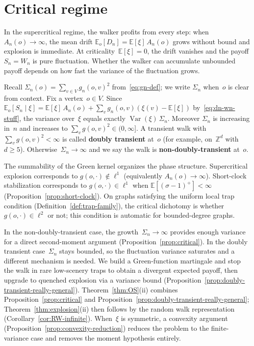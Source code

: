 \documentclass[11pt]{amsart}
\theoremstyle{plain}
\theoremstyle{definition}
\newcommand{\Z}{\mathbb{Z}}
\newcommand{\E}{\mathbb{E}}
\DeclareMathOperator{\var}{Var}
\begin{document}
	
	\section{Critical regime}\label{sec:critical}
	
	In the supercritical regime, the walker profits from every step: when $A_n(o)\to\infty$, the mean drift $\E_o[D_n]=\E[\xi]\,A_n(o)$ grows without bound and explosion is immediate. At criticality~$\E[\xi]=0$, the drift vanishes and the payoff $S_n = W_n$ is pure fluctuation. Whether the walker can accumulate unbounded payoff depends on how fast the variance of the fluctuation grows.
	
	Recall $\Sigma_n(o)=\sum_{v\in V} g_n(o,v)^2$ from~\eqref{eq:gn-def}; we write $\Sigma_n$ when~$o$ is clear from context. Fix a vertex~$o\in V$.
	Since~$\E_o[S_n\mid\xi]=\E[\xi]\,A_n(o)+\sum_v g_n(o,v)(\xi(v)-\E[\xi])$ by~\eqref{eq:dn-wn-stuff}, the variance over~$\xi$ equals exactly $\var(\xi)\,\Sigma_n$. Moreover $\Sigma_n$ is increasing in~$n$ and increases to $\sum_v g(o,v)^2\in(0,\infty]$.
	A transient walk with~$\sum_v g(o,v)^2<\infty$ is called \textbf{doubly transient} at~$o$ (for example, on~$\Z^d$ with $d\geq 5$). Otherwise~$\Sigma_n\to\infty$ and we say the walk is \textbf{non-doubly-transient} at~$o$.
	
	The summability of the Green kernel organizes the phase structure. Supercritical explosion corresponds to $g(o,\cdot)\notin\ell^1$ (equivalently $A_n(o)\to\infty$). Short-clock stabilization corresponds to $g(o,\cdot)\in\ell^1$ when $\E[(\sigma-1)^+]<\infty$ (Proposition~\ref{prop:short-clock}). On graphs satisfying the uniform local trap condition (Definition~\ref{def:trap-family}), the critical dichotomy is whether $g(o,\cdot)\in\ell^2$ or not; this condition is automatic for bounded-degree graphs.
	
	In the non-doubly-transient case, the growth~$\Sigma_n\to\infty$ provides enough variance for a direct second-moment argument (Proposition~\ref{prop:critical}).
	In the doubly transient case~$\Sigma_n$ stays bounded, so the fluctuation variance saturates and a different mechanism is needed.
	We build a Green-function martingale and stop the walk in rare low-scenery traps to obtain a divergent expected payoff, then upgrade to quenched explosion via a variance bound (Proposition~\ref{prop:doubly-transient-really-general}).
	Theorem~\ref{thm:OS}(ii) combines Proposition~\ref{prop:critical} and Proposition~\ref{prop:doubly-transient-really-general}; Theorem~\ref{thm:explosion}(ii) then follows by the random walk representation (Corollary~\ref{cor:RW-infinite}).
	When~$\xi$ is symmetric, a convexity argument (Proposition~\ref{prop:convexity-reduction}) reduces the problem to the finite-variance case and removes the moment hypothesis entirely.
	
\end{document}
